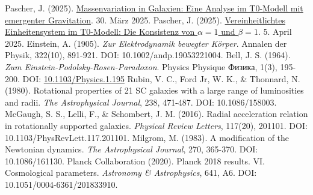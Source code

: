 \documentclass[12pt,a4paper]{article}
\begin{document}
\begin{thebibliography}{99}
		 Pascher, J. (2025). \href{https://github.com/jpascher/T0-Time-Mass-Duality/tree/main/2/pdf/Deutsch/Massenvariation\%20in\%20Galaxien.pdf}{Massenvariation in Galaxien: Eine Analyse im T0-Modell mit emergenter Gravitation}. 30. März 2025.
		 Pascher, J. (2025). \href{https://github.com/jpascher/T0-Time-Mass-Duality/tree/main/2/pdf/Deutsch/Die\%20Konsistenz\%20von\%20alpha\%20=\%201\%20und\%20beta\%20=\%201.pdf}{Vereinheitlichtes Einheitensystem im T0-Modell: Die Konsistenz von \(\alpha = 1\) und \(\beta = 1\)}. 5. April 2025.
		 Einstein, A. (1905). \textit{Zur Elektrodynamik bewegter Körper}. Annalen der Physik, 322(10), 891-921. DOI: 10.1002/andp.19053221004.
		 Bell, J. S. (1964). \textit{Zum Einstein-Podolsky-Rosen-Paradoxon}. Physics Physique {\selectfont Физика}, 1(3), 195-200. DOI: \href{https://doi.org/10.1103/Physics.1.195}{10.1103/Physics.1.195}
		 Rubin, V. C., Ford Jr, W. K., \& Thonnard, N. (1980). Rotational properties of 21 SC galaxies with a large range of luminosities and radii. \textit{The Astrophysical Journal}, 238, 471-487. DOI: 10.1086/158003.
		 McGaugh, S. S., Lelli, F., \& Schombert, J. M. (2016). Radial acceleration relation in rotationally supported galaxies. \textit{Physical Review Letters}, 117(20), 201101. DOI: 10.1103/PhysRevLett.117.201101.
		 Milgrom, M. (1983). A modification of the Newtonian dynamics. \textit{The Astrophysical Journal}, 270, 365-370. DOI: 10.1086/161130.
		 Planck Collaboration (2020). Planck 2018 results. VI. Cosmological parameters. \textit{Astronomy \& Astrophysics}, 641, A6. DOI: 10.1051/0004-6361/201833910.
	\end{thebibliography}
	
\end{document}
